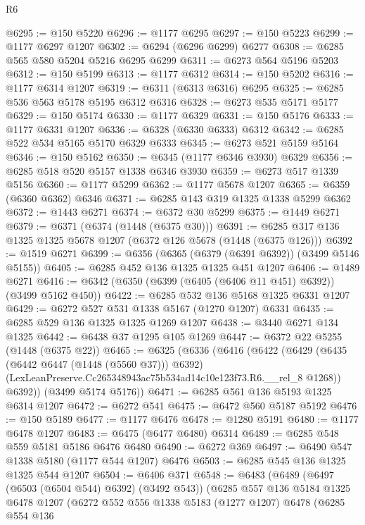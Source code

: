 \begin{lexlean}{R6}
\begin{coremodule}
@6295 := @150 @5220
@6296 := @1177 @6295
@6297 := @150 @5223
@6299 := @1177 @6297 @1207
@6302 := @6294 (@6296 @6299) @6277
@6308 := @6285 @565 @580 @5204 @5216 @6295 @6299
@6311 := @6273 @564 @5196 @5203
@6312 := @150 @5199
@6313 := @1177 @6312
@6314 := @150 @5202
@6316 := @1177 @6314 @1207
@6319 := @6311 (@6313 @6316) @6295
@6325 := @6285 @536 @563 @5178 @5195 @6312 @6316
@6328 := @6273 @535 @5171 @5177
@6329 := @150 @5174
@6330 := @1177 @6329
@6331 := @150 @5176
@6333 := @1177 @6331 @1207
@6336 := @6328 (@6330 @6333) @6312
@6342 := @6285 @522 @534 @5165 @5170 @6329 @6333
@6345 := @6273 @521 @5159 @5164
@6346 := @150 @5162
@6350 := @6345 (@1177 @6346 @3930) @6329
@6356 := @6285 @518 @520 @5157 @1338 @6346 @3930
@6359 := @6273 @517 @1339 @5156
@6360 := @1177 @5299
@6362 := @1177 @5678 @1207
@6365 := @6359 (@6360 @6362) @6346
@6371 := @6285 @143 @319 @1325 @1338 @5299 @6362
@6372 := @1443 @6271
@6374 := @6372 @30 @5299
@6375 := @1449 @6271
@6379 := @6371 (@6374 (@1448 (@6375 @30)))
@6391 := @6285 @317 @136 @1325 @1325 @5678 @1207 (@6372 @126 @5678 (@1448 (@6375 @126)))
@6392 := @1519 @6271
@6399 := @6356 (@6365 (@6379 (@6391 @6392)) (@3499 @5146 @5155))
@6405 := @6285 @452 @136 @1325 @1325 @451 @1207
@6406 := @1489 @6271
@6416 := @6342 (@6350 (@6399 (@6405 (@6406 @11 @451) @6392)) (@3499 @5162 @450))
@6422 := @6285 @532 @136 @5168 @1325 @6331 @1207
@6429 := @6272 @527 @531 @1338 @5167 (@1270 @1207) @6331
@6435 := @6285 @529 @136 @1325 @1325 @1269 @1207
@6438 := @3440 @6271 @134 @1325
@6442 := @6438 @37 @1295 @105 @1269
@6447 := @6372 @22 @5255 (@1448 (@6375 @22))
@6465 := @6325
    (@6336
      (@6416
        (@6422
          (@6429
            (@6435 (@6442 @6447 (@1448 (@5560 @37))) @6392)
            (LexLeanPreserve.Cc265348943ac75b534ad14c10e123f73.R6.__rel_8 @1268))
          @6392))
      (@3499 @5174 @5176))
@6471 := @6285 @561 @136 @5193 @1325 @6314 @1207
@6472 := @6272 @541
@6475 := @6472 @560 @5187 @5192
@6476 := @150 @5189
@6477 := @1177 @6476
@6478 := @1280 @5191
@6480 := @1177 @6478 @1207
@6483 := @6475 (@6477 @6480) @6314
@6489 := @6285 @548 @559 @5181 @5186 @6476 @6480
@6490 := @6272 @369
@6497 := @6490 @547 @1338 @5180 (@1177 @544 @1207) @6476
@6503 := @6285 @545 @136 @1325 @1325 @544 @1207
@6504 := @6406 @371
@6548 := @6483
    (@6489
      (@6497 (@6503 (@6504 @544) @6392) (@3492 @543))
      (@6285
        @557
        @136
        @5184
        @1325
        @6478
        @1207
        (@6272
          @552
          @556
          @1338
          @5183
          (@1277 @1207)
          @6478
          (@6285
            @554
            @136

\end{coremodule}
\end{lexlean}
